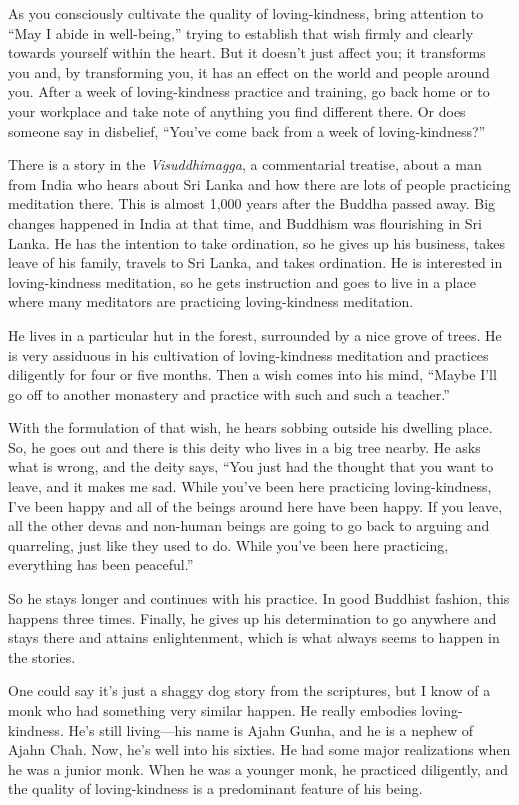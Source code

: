 As you consciously cultivate the quality of loving-kindness, bring
attention to “May I abide in well-being,” trying to establish that wish
firmly and clearly towards yourself within the heart. But it doesn’t
just affect you; it transforms you and, by transforming you, it has an
effect on the world and people around you. After a week of
loving-kindness practice and training, go back home or to your workplace
and take note of anything you find different there. Or does someone say
in disbelief, “You’ve come back from a week of loving-kindness?”

There is a story in the \emph{Visuddhimagga}, a commentarial treatise,
about a man from India who hears about Sri Lanka and how there are lots
of people practicing meditation there. This is almost 1,000 years after
the Buddha passed away. Big changes happened in India at that time, and
Buddhism was flourishing in Sri Lanka. He has the intention to take
ordination, so he gives up his business, takes leave of his family,
travels to Sri Lanka, and takes ordination. He is interested in
loving-kindness meditation, so he gets instruction and goes to live in a
place where many meditators are practicing loving-kindness meditation.

He lives in a particular hut in the forest, surrounded by a nice grove
of trees. He is very assiduous in his cultivation of loving-kindness
meditation and practices diligently for four or five months. Then a wish
comes into his mind, “Maybe I’ll go off to another monastery and
practice with such and such a teacher.”

With the formulation of that wish, he hears sobbing outside his dwelling
place. So, he goes out and there is this deity who lives in a big tree
nearby. He asks what is wrong, and the deity says, “You just had the
thought that you want to leave, and it makes me sad. While you’ve been
here practicing loving-kindness, I’ve been happy and all of the beings
around here have been happy. If you leave, all the other devas and
non-human beings are going to go back to arguing and quarreling, just
like they used to do. While you’ve been here practicing, everything has
been peaceful.”

So he stays longer and continues with his practice. In good Buddhist
fashion, this happens three times. Finally, he gives up his
determination to go anywhere and stays there and attains enlightenment,
which is what always seems to happen in the stories.

One could say it’s just a shaggy dog story from the scriptures, but I
know of a monk who had something very similar happen. He really embodies
loving-kindness. He’s still living—his name is Ajahn Gunha, and he is a
nephew of Ajahn Chah. Now, he’s well into his sixties. He had some major
realizations when he was a junior monk. When he was a younger monk, he
practiced diligently, and the quality of loving-kindness is a
predominant feature of his being.

